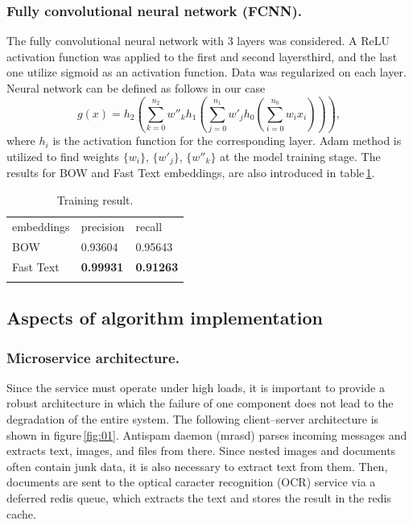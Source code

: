 \documentclass[12pt]{jpconf}
\begin{document}
\subsubsection*{Fully convolutional neural network (FCNN).}
The fully convolutional neural network with 3 layers was considered. A \textsf{ReLU} activation function was applied to the first and second layersthird, and the last one utilize \textsf{sigmoid} as an activation function. Data was regularized on each layer. Neural network can be defined as follows in our case
$$
g(x) = h_2 \left(\sum_{k=0}^{n_2} w''_k h_1\left(\sum_{j=0}^{n_1} w'_j h_0\left( \sum_{i=0}^{n_0} w_i x_i \right)\right)\right),
$$
where $h_i$ is the activation function for the corresponding layer. Adam method is utilized to find weights $\{w_i\}$, $\{w'_j\}$, $\{w''_k\}$ at the model training stage.
The results for BOW and Fast Text embeddings, are also introduced in table\,\ref{tbl:02}.
\begin{table}[h!]
	\centering
	\caption{\label{tbl:02}Training result.}
	\begin{center}
	\begin{tabular}{lll}
		\br
		embeddings & precision & recall \\
		\mr
		BOW & 0.93604 & 0.95643 \\ \hline
		Fast Text & \bf 0.99931 & \bf 0.91263 \\ 
		\br
	\end{tabular}
	\end{center}
\end{table}

\subsection{Aspects of algorithm implementation}
\subsubsection*{Microservice architecture.}
Since the service must operate under high loads, it is important to provide a robust architecture in which the failure of one component does not lead to the degradation of the entire system. The following client--server architecture is shown in figure\,\ref{fig:01}. Antispam daemon (mrasd) parses incoming messages and extracts text, images, and files from there. Since nested images and documents often contain junk data, it is also necessary to extract text from them. Then, documents are sent to the optical caracter recognition (OCR) service via a deferred redis queue, which extracts the text and stores the result in the redis cache.
\end{document}
